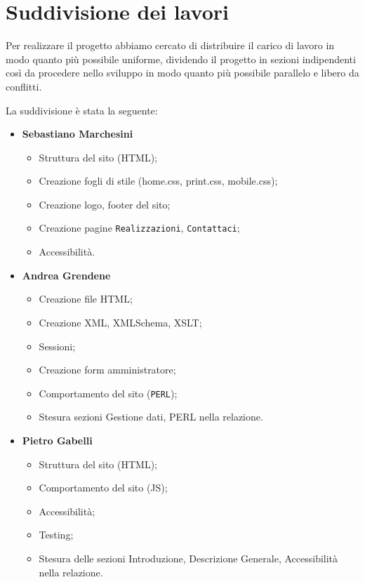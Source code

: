 \section{Suddivisione dei lavori}{
	Per realizzare il progetto abbiamo cercato di distribuire il carico di lavoro in modo quanto più possibile uniforme, dividendo il progetto in sezioni indipendenti così da procedere nello sviluppo in modo quanto più possibile parallelo e libero da conflitti.
	
	La suddivisione è stata la seguente: 	
	\begin{itemize}\itemsep1pt
		\item \textbf{Sebastiano Marchesini} 
		\begin{itemize}\itemsep1pt
			\item Struttura del sito (HTML);
			\item Creazione fogli di stile (home.css, print.css, mobile.css);
			\item Creazione logo, footer del sito;
			\item Creazione pagine \texttt{Realizzazioni}, \texttt{Contattaci};
			\item Accessibilità.
		\end{itemize}
		\item \textbf{Andrea Grendene}
		\begin{itemize}\itemsep1pt
			\item Creazione file HTML;
			\item Creazione XML, XMLSchema, XSLT;
			\item Sessioni;
			\item Creazione form amministratore;
			\item Comportamento del sito (\texttt{PERL});
			\item Stesura sezioni Gestione dati, PERL nella relazione.
		\end{itemize}
		\item \textbf{Pietro Gabelli}
		\begin{itemize}\itemsep1pt
			\item Struttura del sito (HTML);
			\item Comportamento del sito (JS);
			\item Accessibilità;
			\item Testing;
			\item Stesura delle sezioni Introduzione, Descrizione Generale, Accessibilità nella relazione.
		\end{itemize}
	\end{itemize}
}